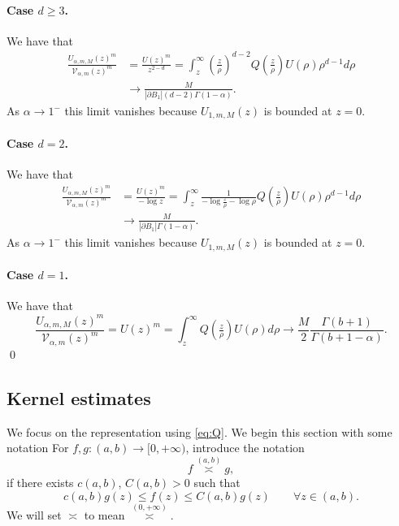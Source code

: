 \documentclass[a4paper]{article}
\theoremstyle{definition}
\newcommand{\asympint}[2]{\overset {(#1,#2)}\asymp }
\begin{document}
\paragraph{Case $d \ge 3$.} We have that
\begin{align*}
  \frac{U_{\alpha,m,M}(z)^m}{\mathcal V_{\alpha,m}(z)^m} &= \frac{ U (z)^m }{z^{2-d}} = \int_{z}^\infty (\tfrac{z}{\rho} )^{d-2}Q(\tfrac{z}{\rho})  U(\rho) \rho^{d-1} d \rho
  \\
  &\to \frac{M}{|\partial B_1| (d-2)\Gamma(1-\alpha)} .
\end{align*}
As $\alpha \to 1^-$ this limit vanishes because $U_{1,m,M}(z)$ is bounded at $z = 0$.

\paragraph{Case $d =2$.} We have that
\begin{align*}
  \frac{U_{\alpha,m,M}(z)^m}{\mathcal V_{\alpha,m}(z)^m} &= \frac{ U (z)^m }{-\log z}
  = \int_{z}^\infty \frac{1}{-\log \frac z \rho - \log \rho} Q(\tfrac{z}{\rho})  U(\rho) \rho^{d-1} d \rho
  \\
  &\to \frac{M}{|\partial B_1| \Gamma(1-\alpha)} .
\end{align*}
As $\alpha \to 1^-$ this limit vanishes because $U_{1,m,M}(z)$ is bounded at $z = 0$.

\paragraph{Case $d = 1$.} We have that
\begin{equation*}
  \frac{U_{\alpha,m,M}(z)^m}{\mathcal V_{\alpha,m}(z)^m} = U (z)^m = \int_{z}^\infty Q(\tfrac{z}{\rho}) U(\rho) d \rho \to \frac{M}{2}\frac{\Gamma(b+1)}{\Gamma(b+1-\alpha)}.
\end{equation*}
\qed

%
\subsection{Kernel estimates}

We focus on the representation using \eqref{eq:Q}.
We begin this section with some notation
For $f, g: (a,b) \to [0,+\infty)$, introduce the notation
\[
  f \asympint{a}{b} g,
\]
if there exists $c(a,b)$, $C(a,b) > 0$ such that
\begin{equation*}
  c(a,b) g(z) \le f(z) \le C(a,b) g(z) \qquad \forall z \in (a,b).
\end{equation*}
We will set $\asymp$ to mean $\asympint{0}{+\infty}$.
\end{document}
